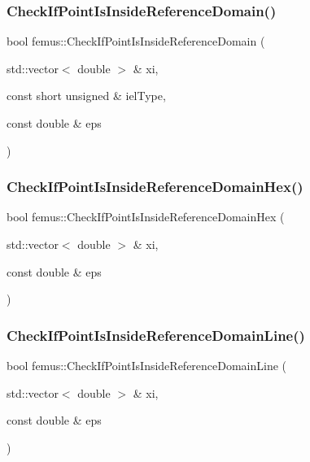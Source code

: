 \subsubsection{\texorpdfstring{Check\+If\+Point\+Is\+Inside\+Reference\+Domain()}{CheckIfPointIsInsideReferenceDomain()}}
{\footnotesize\ttfamily bool femus\+::\+Check\+If\+Point\+Is\+Inside\+Reference\+Domain (\begin{DoxyParamCaption}\item[{std\+::vector$<$ double $>$ \&}]{xi,  }\item[{const short unsigned \&}]{iel\+Type,  }\item[{const double \&}]{eps }\end{DoxyParamCaption})}

\mbox{\label{namespacefemus_afbdc1796e04b92a1b1242ec4da84a246}} 
\subsubsection{\texorpdfstring{Check\+If\+Point\+Is\+Inside\+Reference\+Domain\+Hex()}{CheckIfPointIsInsideReferenceDomainHex()}}
{\footnotesize\ttfamily bool femus\+::\+Check\+If\+Point\+Is\+Inside\+Reference\+Domain\+Hex (\begin{DoxyParamCaption}\item[{std\+::vector$<$ double $>$ \&}]{xi,  }\item[{const double \&}]{eps }\end{DoxyParamCaption})}

\mbox{\label{namespacefemus_ad7a83e8b49ce11bd61a9a08ec95e8946}} 
\subsubsection{\texorpdfstring{Check\+If\+Point\+Is\+Inside\+Reference\+Domain\+Line()}{CheckIfPointIsInsideReferenceDomainLine()}}
{\footnotesize\ttfamily bool femus\+::\+Check\+If\+Point\+Is\+Inside\+Reference\+Domain\+Line (\begin{DoxyParamCaption}\item[{std\+::vector$<$ double $>$ \&}]{xi,  }\item[{const double \&}]{eps }\end{DoxyParamCaption})}

